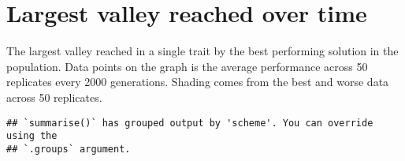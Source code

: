 \documentclass[]{book}
\newenvironment{Shaded}{\begin{snugshade}}{\end{snugshade}}
\newcommand{\DataTypeTok}[1]{\textcolor[rgb]{0.13,0.29,0.53}{#1}}
\newcommand{\KeywordTok}[1]{\textcolor[rgb]{0.13,0.29,0.53}{\textbf{#1}}}
\newcommand{\NormalTok}[1]{#1}
\newcommand{\OperatorTok}[1]{\textcolor[rgb]{0.81,0.36,0.00}{\textbf{#1}}}
\newcommand{\StringTok}[1]{\textcolor[rgb]{0.31,0.60,0.02}{#1}}
\begin{document}
\hypertarget{largest-valley-reached-over-time-1}{%
\section{Largest valley reached over time}\label{largest-valley-reached-over-time-1}}

The largest valley reached in a single trait by the best performing solution in the population.
Data points on the graph is the average performance across 50 replicates every 2000 generations.
Shading comes from the best and worse data across 50 replicates.

\begin{Shaded}
\end{Shaded}

\begin{verbatim}
## `summarise()` has grouped output by 'scheme'. You can override using the
## `.groups` argument.
\end{verbatim}
\end{document}

